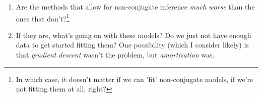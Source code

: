 \documentclass[a4paper, 11pt]{article}
\begin{document}
\begin{enumerate}
    \begin{enumerate}
        \item Are the methods that allow for non-conjugate inference \emph{much worse} than the ones that don't?\footnote{In which case, it doesn't matter if we can 'fit' non-conjugate models, if we're not fitting them at all, right?}
        \item If they are, what's going on with these models? Do we just not have enough data to get started fitting them? One possibility (which I consider likely) is that \emph{gradient descent} wasn't the problem, but \emph{amortization} was.
    \end{enumerate}
\end{enumerate}

\printbibliography
\end{document}
